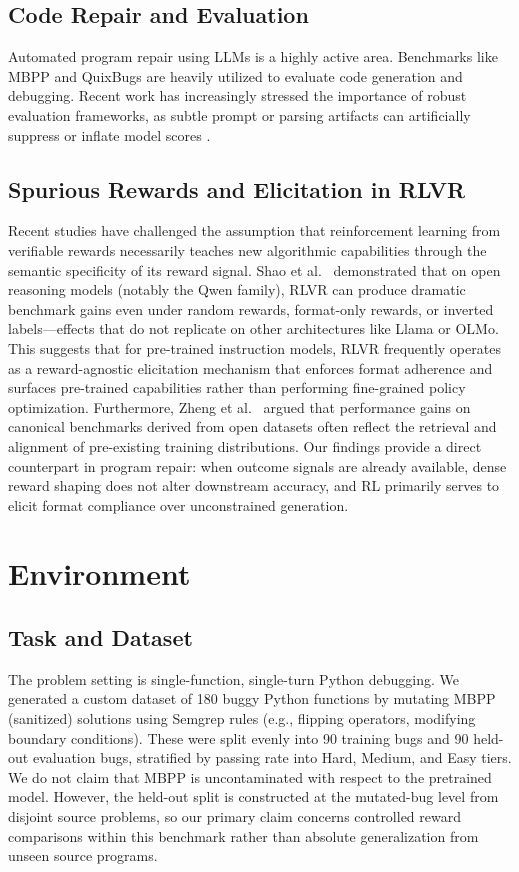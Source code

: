 \documentclass{article}
\begin{document}
\subsection{Code Repair and Evaluation}
Automated program repair using LLMs is a highly active area. Benchmarks like MBPP and QuixBugs \cite{Lin2017} are heavily utilized to evaluate code generation and debugging. Recent work has increasingly stressed the importance of robust evaluation frameworks, as subtle prompt or parsing artifacts can artificially suppress or inflate model scores \cite{Tian2024, Tam2024}.

\subsection{Spurious Rewards and Elicitation in RLVR}
Recent studies have challenged the assumption that reinforcement learning from verifiable rewards necessarily teaches new algorithmic capabilities through the semantic specificity of its reward signal. Shao et al.~\cite{Shao2025Spurious} demonstrated that on open reasoning models (notably the Qwen family), RLVR can produce dramatic benchmark gains even under random rewards, format-only rewards, or inverted labels—effects that do not replicate on other architectures like Llama or OLMo. This suggests that for pre-trained instruction models, RLVR frequently operates as a reward-agnostic elicitation mechanism that enforces format adherence and surfaces pre-trained capabilities rather than performing fine-grained policy optimization. Furthermore, Zheng et al.~\cite{Zheng2025Contamination} argued that performance gains on canonical benchmarks derived from open datasets often reflect the retrieval and alignment of pre-existing training distributions. Our findings provide a direct counterpart in program repair: when outcome signals are already available, dense reward shaping does not alter downstream accuracy, and RL primarily serves to elicit format compliance over unconstrained generation.

\section{Environment}

\subsection{Task and Dataset}
The problem setting is single-function, single-turn Python debugging. We generated a custom dataset of 180 buggy Python functions by mutating MBPP (sanitized) \cite{Austin2021} solutions using Semgrep rules (e.g., flipping operators, modifying boundary conditions). These were split evenly into 90 training bugs and 90 held-out evaluation bugs, stratified by passing rate into Hard, Medium, and Easy tiers. We do not claim that MBPP is uncontaminated with respect to the pretrained model. However, the held-out split is constructed at the mutated-bug level from disjoint source problems, so our primary claim concerns controlled reward comparisons within this benchmark rather than absolute generalization from unseen source programs.
\end{document}
